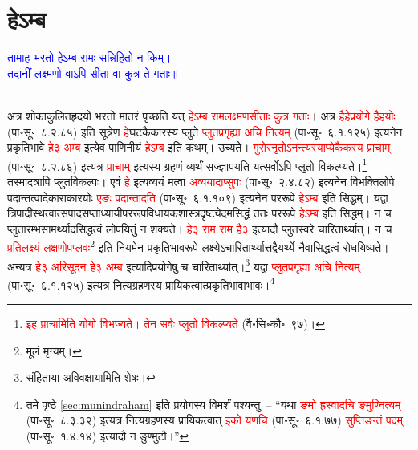 \section[हेऽम्ब]{हेऽम्ब}
\centering\textcolor{blue}{तामाह भरतो हेऽम्ब रामः सन्निहितो न किम्।\nopagebreak\\
तदानीं लक्ष्मणो वाऽपि सीता वा कुत्र ते गताः॥}\nopagebreak\\
\\
\begin{sloppypar}\justifying\noindent\hspace{10mm} अत्र शोकाकुलित\-हृदयो भरतो मातरं पृच्छति यत् \textcolor{red}{हेऽम्ब राम\-लक्ष्मण\-सीताः कुत्र गताः}। अत्र \textcolor{red}{हैहेप्रयोगे हैहयोः} (पा॰सू॰~८.२.८५) इति सूत्रेण \textcolor{red}{हे}\-घटकैकारस्य प्लुते \textcolor{red}{प्लुतप्रगृह्या अचि नित्यम्‌} (पा॰सू॰~६.१.१२५) इत्यनेन प्रकृति\-भावे \textcolor{red}{हे३ अम्ब} इत्येव पाणिनीयं \textcolor{red}{हेऽम्ब} इति कथम्। उच्यते। \textcolor{red}{गुरोरनृतोऽनन्त्यस्याप्येकैकस्य प्राचाम्‌} (पा॰सू॰~८.२.८६) इत्यत्र \textcolor{red}{प्राचाम्‌} इत्यस्य ग्रहणं व्यर्थं सज्ज्ञापयति यत्सर्वोऽपि प्लुतो विकल्प्यते।\footnote{\textcolor{red}{इह प्राचामिति योगो विभज्यते। तेन सर्वः प्लुतो विकल्प्यते} (वै॰सि॰कौ॰~९७)।} तस्मादत्रापि प्लुत\-विकल्पः। एवं \textcolor{red}{हे} इत्यव्ययं मत्वा \textcolor{red}{अव्ययादाप्सुपः} (पा॰सू॰~२.४.८२) इत्यनेन विभक्ति\-लोपे पदान्तत्वादेकाराकारयोः \textcolor{red}{एङः पदान्तादति} (पा॰सू॰~६.१.१०९) इत्यनेन पररूपे \textcolor{red}{हेऽम्ब} इति सिद्धम्। यद्वा त्रिपादीस्थत्वात्सपाद\-सप्ताध्यायी\-पर\-रूप\-विधायक\-शास्त्र\-दृष्ट्येदमसिद्धं ततः पर\-रूपे \textcolor{red}{हेऽम्ब} इति सिद्धम्। न च प्लुतारम्भ\-सामर्थ्यादसिद्धत्वं लोपयितुं न शक्यते। \textcolor{red}{हे३ राम राम है३} इत्यादौ प्लुत\-स्वरे चारितार्थ्यात्। न च \textcolor{red}{प्रतिलक्ष्यं लक्षणोपप्लवः}\footnote{मूलं मृग्यम्।}
इति नियमेन प्रकृति\-भाव\-रूपे लक्ष्येऽचारितार्थ्यात्तद्वैयर्थ्ये नैवासिद्धत्वं रोधयिष्यते। अन्यत्र \textcolor{red}{हे३ अरि\-सूदन} \textcolor{red}{हे३ अम्ब} इत्यादि\-प्रयोगेषु च चारितार्थ्यात्।\footnote{संहिताया अविवक्षायामिति शेषः।}
यद्वा \textcolor{red}{प्लुत\-प्रगृह्या अचि नित्यम्‌} (पा॰सू॰~६.१.१२५) इत्यत्र नित्य\-ग्रहणस्य प्रायिकत्वात्प्रकृति\-भावाभावः।\footnote{\pageref{sec:munindraham}तमे पृष्ठे \ref{sec:munindraham}  इति प्रयोगस्य विमर्शं पश्यन्तु~– “यथा \textcolor{red}{ङमो ह्रस्वादचि ङमुण्नित्यम्‌} (पा॰सू॰~८.३.३२) इत्यत्र नित्यग्रहणस्य प्रायिकत्वात् \textcolor{red}{इको यणचि} (पा॰सू॰~६.१.७७) \textcolor{red}{सुप्तिङन्तं पदम्‌} (पा॰सू॰~१.४.१४) इत्यादौ न ङुण्मुटौ।”}\end{sloppypar}
